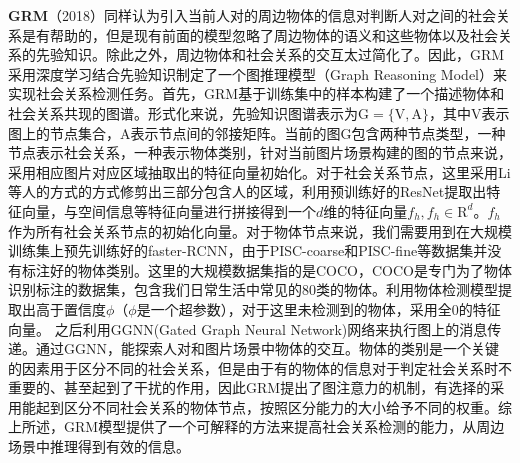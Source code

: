 \textbf{GRM}（2018）\cite{wang2018deep}同样认为引入当前人对的周边物体的信息对判断人对之间的社会关系是有帮助的，但是现有前面的模型忽略了周边物体的语义和这些物体以及社会关系的先验知识。除此之外，周边物体和社会关系的交互太过简化了。因此，GRM采用深度学习结合先验知识制定了一个图推理模型（Graph Reasoning Model）来实现社会关系检测任务。首先，GRM基于训练集中的样本构建了一个描述物体和社会关系共现的图谱。形式化来说，先验知识图谱表示为$\mathrm{G} = \{\mathrm{V},\mathrm{A}\}$，其中$\mathrm{V}$表示图上的节点集合，$\mathrm{A}$表示节点间的邻接矩阵。当前的图$\mathrm{G}$包含两种节点类型，一种节点表示社会关系，一种表示物体类别，针对当前图片场景构建的图的节点来说，采用相应图片对应区域抽取出的特征向量初始化。对于社会关系节点，这里采用Li等人的方式\cite{li2017dual-glance}的方式修剪出三部分包含人的区域，利用预训练好的ResNet提取出特征向量，与空间信息等特征向量进行拼接得到一个$d$维的特征向量$f_{h},f_{h} \in \mathrm{R}^d$。$f_h$作为所有社会关系节点的初始化向量。对于物体节点来说，我们需要用到在大规模训练集上预先训练好的faster-RCNN\cite{ren2015faster}，由于PISC-coarse和PISC-fine等数据集并没有标注好的物体类别。这里的大规模数据集指的是COCO\cite{lin2014microsoft}，COCO是专门为了物体识别标注的数据集，包含我们日常生活中常见的80类的物体。利用物体检测模型提取出高于置信度$\phi$（$\phi$是一个超参数），对于这里未检测到的物体，采用全$0$的特征向量。
之后利用GGNN(Gated Graph Neural Network)网络\cite{li2016gated}来执行图上的消息传递。通过GGNN，能探索人对和图片场景中物体的交互。物体的类别是一个关键的因素用于区分不同的社会关系，但是由于有的物体的信息对于判定社会关系时不重要的、甚至起到了干扰的作用，因此GRM提出了图注意力的机制，有选择的采用能起到区分不同社会关系的物体节点，按照区分能力的大小给予不同的权重。综上所述，GRM模型提供了一个可解释的方法来提高社会关系检测的能力，从周边场景中推理得到有效的信息。

